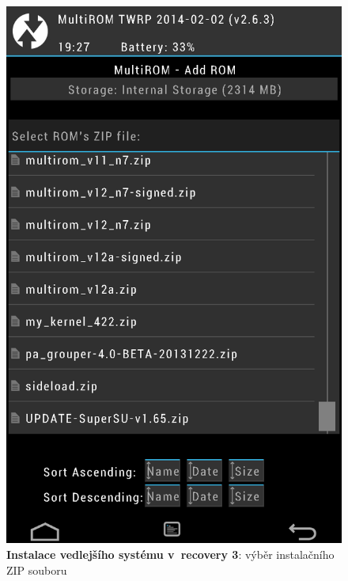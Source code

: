 \documentclass[12pt, a4paper, oneside]{article}
\newcommand{\B}{\textbf} %
\begin{document}
\begin{figure}[H]
\begin{center}
 \includegraphics[height=\textheight-40]{img/recovery_install3.png}
\caption{\B{Instalace vedlejšího systému v~recovery 3}: výběr instalačního ZIP souboru}
\end{center}
\end{figure}


\newpage
\end{document}
